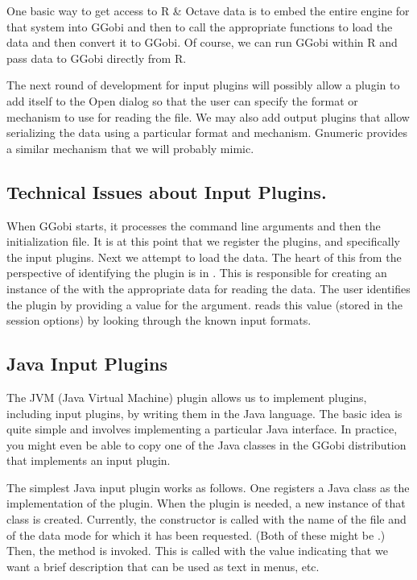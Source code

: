 \documentclass{article}
\def\file#1{\href{#1}{\Escape{#1}}}
\begin{document}
One basic way to get access to R \& Octave data is to embed the entire
engine for that system into GGobi and then to call the appropriate
functions to load the data and then convert it to GGobi.  Of course,
we can run GGobi within R and pass data to GGobi directly from R.


The next round of development for input plugins will possibly allow a
plugin to add itself to the Open dialog so that the user can specify
the format or mechanism to use for reading the file.  We may also add
output plugins that allow serializing the data using a particular
format and mechanism. Gnumeric provides a similar mechanism that we
will probably mimic.


\subsection{Technical Issues about Input Plugins.}
When GGobi starts, it processes the command line arguments and then the
initialization file.  It is at this point that we register the
plugins, and specifically the input plugins.  Next we attempt to load
the data.  The heart of this from the perspective of identifying the
plugin is  in \file{make_ggobi.c}.  This is
responsible for creating an instance of the 
with the appropriate data for reading the data.  The user identifies
the plugin by providing a value for the  argument.
 reads this value (stored in the session
options) by looking through the known input formats.

\subsection{Java Input Plugins}

The JVM (Java Virtual Machine) plugin allows us to implement plugins,
including input plugins, by writing them in the Java language.  The
basic idea is quite simple and involves implementing a particular Java
interface.  In practice, you might even be able to copy one of the
Java classes in the GGobi distribution that implements an input
plugin.

The simplest Java input plugin works as follows.  One registers a Java
class as the implementation of the plugin. When the plugin is needed,
a new instance of that class is created.  Currently, the constructor
is called with the name of the file and of the data mode for which it
has been requested. (Both of these might be \JNull.)  Then, the
 method is invoked.  This is called with
the value \JTrue{} indicating that we want a brief description that
can be used as text in menus, etc.
\end{document}
